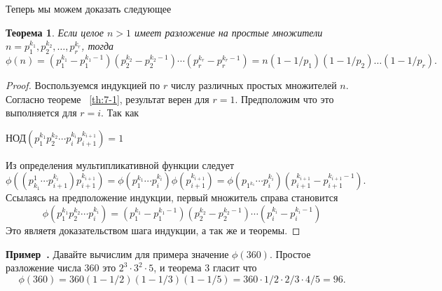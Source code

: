 \documentclass[11pt]{article}
\newtheorem{theorem}{Теорема}
\newcounter{example}[section]
\newenvironment{example}[1][]{\refstepcounter{example}\par\medskip
	\noindent \textbf{Пример~\theexample. #1} \rmfamily}{\medskip}
\begin{document}
\begin{center}
Теперь мы можем доказать следующее
\end{center}
\begin{theorem}
	Если целое $n>1$ имеет разложение на простые множители $n=p_{1}^{k_1},p_{2}^{k_2},\ldots, p_{r}^{k_r}$, тогда
	\[\phi(n) =(p_{1}^{k_1}-p_{1}^{k_{1}-1})(p_{2}^{k_{2}}-p_{2}^{k_{2}-1})\cdots (p_{r}^{k_{r}}-p_{r}^{k_{r}-1})=n(1-1/p_1)(1-1/p_2)\ldots(1-1/p_r).\]
\end{theorem}
\begin{proof}
	Воспользуемся индукцией по $r$ числу различных простых множителей $n$. Согласно теореме ~\ref{th:7-1}, результат верен для $r=1$. Предположим что это выполняется для $r=i$. Так как
\begin{center}
	НОД$(p^{k_1}_{1}p^{k_2}_{2}\cdots p^{k_i}_{i}p^{k_{i+1}}_{i+1})=1$
\end{center}
Из определения мультипликативной функции следует
\[\phi((p_{k_1}^{1}\cdots p^{k_i}_{i+1})p_{i+1}^{k_{i+1}})=\phi(p^{k_1}_{1}\cdots p_{i}^{k_i}) \phi(p_{i+1}^{k_{i+1}})=\phi(p_{1^{k_1}}\cdots p_{i}^{k_{i}})(p_{i+1}^{k_{i+1}}-p_{i+1}^{k_{i+1}-1}).\]
Ссылаясь на предположение индукции, первый множитель справа становится
\[\phi(p_{1}^{k_1}p_{2}^{k_2}\cdots p_{i}^{k_i})=(p_{1}^{k_1}-p_{1}^{k_1-1})(p_{2}^{k_2}-p_{2}^{k_2-1})\cdots
(p_{i}^{k_i}-p_{i}^{k_i-1})\]
Это являетя доказательством шага индукции, а так же и теоремы.
\end{proof}
\begin{example}
	Давайте вычислим для примера значение $\phi(360)$. Простое разложение числа $360$ это $2^3\cdot3^2\cdot5$, и теорема $3$ гласит что 
	\[\phi(360)=360(1-1/2)(1-1/3)(1-1/5)=360\cdot1/2\cdot2/3\cdot4/5=96.
	\]
\end{example}																					
\end{document}
